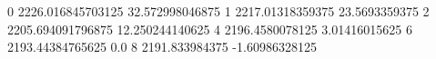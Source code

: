 0 2226.016845703125 32.572998046875
1 2217.01318359375 23.5693359375
2 2205.694091796875 12.250244140625
4 2196.4580078125 3.01416015625
6 2193.44384765625 0.0
8 2191.833984375 -1.60986328125
